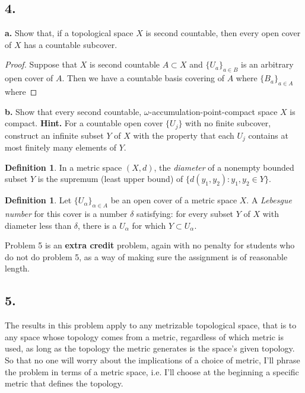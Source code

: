 \documentclass{amsart}
\theoremstyle{plain}
\theoremstyle{definition}
\newtheorem{definition}[theorem]{Definition}
\theoremstyle{remark}
\begin{document}
\vspace{.15in}
\noindent
\subsection*{4.} 

\noindent
{\bfseries a.} Show that, if a topological space $X$ is second countable, then every open cover of $X$ has a countable subcover.

\begin{proof}
    Suppose that $X$ is second countable $A\subset X$ and $\{U_a\}_{a\in B  }$ is an arbitrary open cover of $A$. Then we have a countable basis covering of $A$ where $\{B_a\}_{a \in A}$ where 
\end{proof}

\vspace{.1in}
\noindent
{\bfseries b.} Show that every second countable, $\omega$-accumulation-point-compact space $X$ is compact. {\bfseries Hint.} For a countable open cover $\{ U_j\}$ with no finite subcover, construct an infinite subset $Y$ of $X$ with the property that each $U_j$ contains at most finitely many elements of $Y$. 

\vspace{.15in}
\begin{definition} In a metric space $(X,d)$, the {\it diameter} of a nonempty bounded subset $Y$ is the supremum (least upper bound) of $\{ d(y_1, y_2) : y_1, y_2 \in Y\}$. \end{definition}

\vspace{.15in}
\begin{definition} Let $\{ U_{\alpha}\} _{\alpha \in A}$ be an open cover of a metric space $X$. A {\it Lebesgue number} for this cover is a number $\delta$ satisfying: for every subset $Y$ of $X$ with diameter less than $\delta$, there is a $U_{\alpha}$ for which $Y\subset U_{\alpha}$. \end{definition}

\vspace{.15in}
Problem 5 is an {\bf extra credit} problem, again with no penalty for students who do not do problem 5, as a way of making sure the assignment is of reasonable length.
 
\vspace{.15in}
\noindent
\subsection*{5.} The results in this problem apply to any metrizable topological space, that is to any space whose topology comes from a metric, regardless of which metric is used, as long as the topology the metric generates is the space's given topology. So that no one will worry about the implications of a choice of metric, I'll phrase the problem in terms of a metric space, i.e. I'll choose at the beginning a specific metric that defines the topology.  
\end{document}
